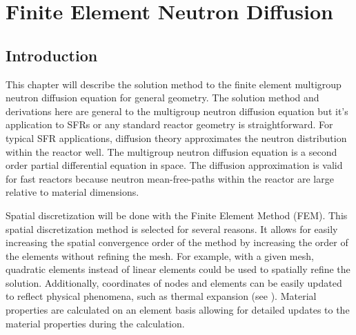 \chapter{Finite Element Neutron Diffusion}
\label{ch:neutronDiffusion}

\section{Introduction}
  This chapter will describe the solution method to the finite element
  multigroup neutron diffusion equation for general geometry. The solution 
  method and derivations here are general to the multigroup neutron diffusion 
  equation but it's application to SFRs or any standard reactor geometry is 
  straightforward. For typical SFR applications, diffusion theory
  approximates the neutron distribution within the reactor well. The multigroup
  neutron diffusion equation is a second order partial differential equation in
  space. The diffusion approximation is valid for fast reactors because neutron
  mean-free-paths within the reactor are large relative to material dimensions.

  Spatial discretization will be done with the Finite 
  Element Method (FEM). This spatial discretization method is selected for 
  several reasons. It allows for easily increasing the spatial convergence order
  of the method by increasing the order of the elements without refining the
  mesh. For example, with a given mesh, quadratic elements instead of linear
  elements could be used to spatially refine the solution. Additionally, 
  coordinates of nodes and elements can be easily updated to reflect physical 
  phenomena, such as thermal expansion (see ). 
  Material properties are calculated on an element basis allowing for detailed
  updates to the material properties during the calculation.

